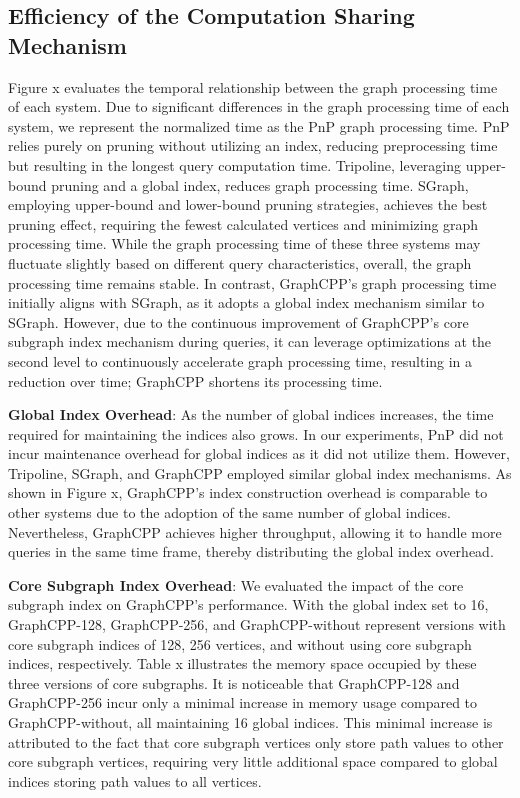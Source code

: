 \documentclass[lettersize,journal]{IEEEtran} %
\begin{document}
\subsection{Efficiency of the Computation Sharing Mechanism}
Figure x evaluates the temporal relationship between the graph processing time of each system. Due to significant differences in the graph processing time of each system, we represent the normalized time as the PnP graph processing time. PnP relies purely on pruning without utilizing an index, reducing preprocessing time but resulting in the longest query computation time. Tripoline, leveraging upper-bound pruning and a global index, reduces graph processing time. SGraph, employing upper-bound and lower-bound pruning strategies, achieves the best pruning effect, requiring the fewest calculated vertices and minimizing graph processing time. While the graph processing time of these three systems may fluctuate slightly based on different query characteristics, overall, the graph processing time remains stable. In contrast, GraphCPP's graph processing time initially aligns with SGraph, as it adopts a global index mechanism similar to SGraph. However, due to the continuous improvement of GraphCPP's core subgraph index mechanism during queries, it can leverage optimizations at the second level to continuously accelerate graph processing time, resulting in a reduction over time; GraphCPP shortens its processing time.

{\bf{Global Index Overhead}}: As the number of global indices increases, the time required for maintaining the indices also grows. In our experiments, PnP did not incur maintenance overhead for global indices as it did not utilize them. However, Tripoline, SGraph, and GraphCPP employed similar global index mechanisms. As shown in Figure x, GraphCPP's index construction overhead is comparable to other systems due to the adoption of the same number of global indices. Nevertheless, GraphCPP achieves higher throughput, allowing it to handle more queries in the same time frame, thereby distributing the global index overhead.

{\bf{Core Subgraph Index Overhead}}: We evaluated the impact of the core subgraph index on GraphCPP's performance. With the global index set to 16, GraphCPP-128, GraphCPP-256, and GraphCPP-without represent versions with core subgraph indices of 128, 256 vertices, and without using core subgraph indices, respectively. Table x illustrates the memory space occupied by these three versions of core subgraphs. It is noticeable that GraphCPP-128 and GraphCPP-256 incur only a minimal increase in memory usage compared to GraphCPP-without, all maintaining 16 global indices. This minimal increase is attributed to the fact that core subgraph vertices only store path values to other core subgraph vertices, requiring very little additional space compared to global indices storing path values to all vertices.
\end{document}

